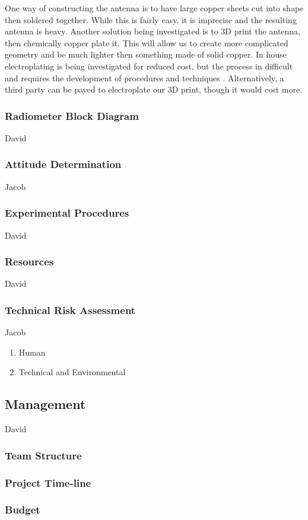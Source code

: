 \documentclass[12pt]{article}
\begin{document}
One way of constructing the antenna is to have large copper sheets cut into shape then soldered together. While
this is fairly easy, it is imprecise and the resulting antenna is heavy. Another solution being investigated is
to 3D print the antenna, then chemically copper plate it. This will allow us to create more complicated geometry
and be much lighter then something made of solid copper. In house electroplating is being investigated for 
reduced cost, but the process in difficult and requires the development of procedures and techniques
\cite{bryancera2014}. Alternatively, a third party can be payed to electroplate our 3D print, though it would 
cost more.

\subsubsection{Radiometer Block Diagram}
David
\subsubsection{Attitude Determination}
Jacob
\subsubsection{Experimental Procedures}
David
\subsubsection{Resources}
David
\subsubsection{Technical Risk Assessment}
Jacob
\begin{enumerate}
\item Human
\cite{omar_el-kassaby_abdelghaffar_2017}
\item Technical and Environmental
\end{enumerate}
\subsection{Management}
David
\subsubsection{Team Structure}
\subsubsection{Project Time-line}
\subsubsection{Budget}
\end{document}
